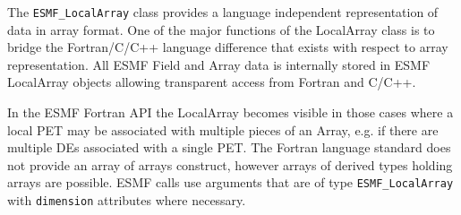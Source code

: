 
The {\tt ESMF\_LocalArray} class provides a language independent 
representation of data in array format. One of the major functions 
of the LocalArray class is to bridge the Fortran/C/C++ language 
difference that exists with respect to array representation. All 
ESMF Field and Array data is internally stored in ESMF LocalArray 
objects allowing transparent access from Fortran and C/C++.

In the ESMF Fortran API the LocalArray becomes visible in those cases 
where a local PET may be associated with multiple pieces of an Array, 
e.g. if there are multiple DEs associated with a single PET. The Fortran 
language standard does not provide an array of arrays construct, however 
arrays of derived types holding arrays are possible. ESMF calls use 
arguments that are of type {\tt ESMF\_LocalArray} with {\tt dimension} 
attributes where necessary.

